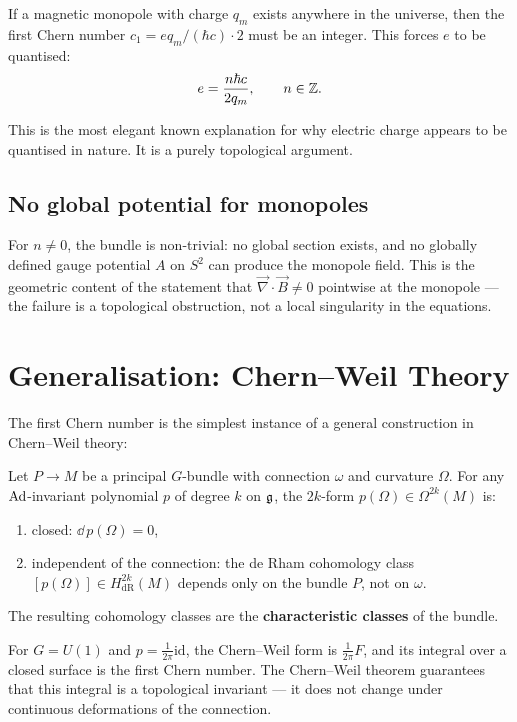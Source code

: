If a magnetic monopole with charge $q_m$ exists anywhere in the universe, then the first Chern number $c_1 = eq_m/(\hbar c) \cdot 2$ must be an integer. This forces $e$ to be quantised:
\begin{equation}
e = \frac{n\hbar c}{2q_m}, \qquad n \in \mathbb{Z}.
\end{equation}

This is the most elegant known explanation for why electric charge appears to be quantised in nature. It is a purely topological argument.

\subsection{No global potential for monopoles}

For $n \neq 0$, the bundle is non-trivial: no global section exists, and no globally defined gauge potential $A$ on $S^2$ can produce the monopole field. This is the geometric content of the statement that $\vec{\nabla}\cdot\vec{B} \neq 0$ pointwise at the monopole --- the failure is a topological obstruction, not a local singularity in the equations.

\section{Generalisation: Chern--Weil Theory}

The first Chern number is the simplest instance of a general construction in Chern--Weil theory:

\begin{theorem}
Let $P \to M$ be a principal $G$-bundle with connection $\omega$ and curvature $\Omega$. For any $\mathrm{Ad}$-invariant polynomial $p$ of degree $k$ on $\mathfrak{g}$, the $2k$-form $p(\Omega) \in \Omega^{2k}(M)$ is:
\begin{enumerate}
\item closed: $\dd\,p(\Omega) = 0$,
\item independent of the connection: the de Rham cohomology class $[p(\Omega)] \in H^{2k}_{\text{dR}}(M)$ depends only on the bundle $P$, not on $\omega$.
\end{enumerate}
The resulting cohomology classes are the \textbf{characteristic classes} of the bundle.
\end{theorem}

For $G = U(1)$ and $p = \frac{1}{2\pi}\mathrm{id}$, the Chern--Weil form is $\frac{1}{2\pi}F$, and its integral over a closed surface is the first Chern number. The Chern--Weil theorem guarantees that this integral is a topological invariant --- it does not change under continuous deformations of the connection.

